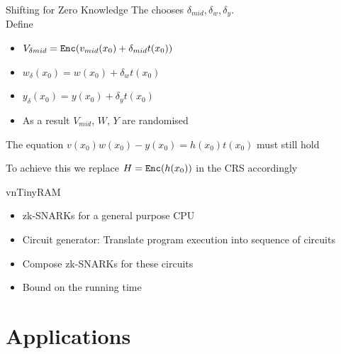 \documentclass[handouts]{beamer}
\begin{document}
\begin{frame}{Shifting for Zero Knowledge}
The \prv chooses $\delta_{mid}, \delta_w, \delta_y$. \\
Define 
\begin{itemize}
\item $V_{\delta{mid}} = \mathtt{Enc}(v_{mid}(x_0)+\delta_{mid}t(x_0))$ \pause
\item $w_{\delta}(x_0) = w(x_0)+\delta_w t(x_0)$ \pause
\item $y_{\delta}(x_0) = y(x_0)+\delta_y t(x_0)$ \pause
\item As a result $V_{mid}$, $W$, $Y$ are randomised \pause
\end{itemize}
The equation $v(x_0)w(x_0)-y(x_0)= h(x_0)t(x_0)$ must still hold \pause

To achieve this we replace $H = \mathtt{Enc}(h(x_0))$ in the CRS accordingly

\end{frame}

\begin{frame}{vnTinyRAM}
\begin{itemize}
    \item zk-SNARKs for a general purpose CPU \pause
    \item Circuit generator: Translate program execution into sequence of circuits \pause
    \item Compose zk-SNARKs for these circuits \pause
    \item Bound on the running time \pause
\end{itemize}
\end{frame}

\section{Applications}
\end{document}
